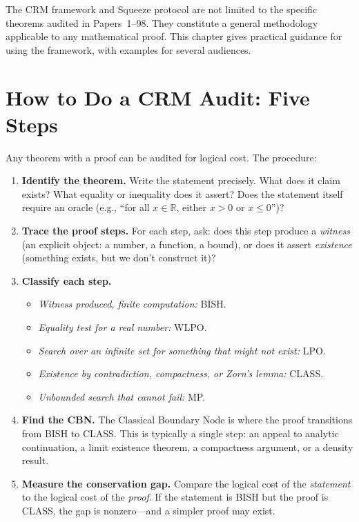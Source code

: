 \documentclass[11pt,twoside,openany]{report}
\theoremstyle{remark}
\newcommand{\BISH}{\textsf{BISH}}
\newcommand{\CLASS}{\textsf{CLASS}}
\begin{document}
The CRM framework and Squeeze protocol are not limited to the specific theorems audited in Papers~1--98. They constitute a general methodology applicable to any mathematical proof. This chapter gives practical guidance for using the framework, with examples for several audiences.


\section{How to Do a CRM Audit: Five Steps}

Any theorem with a proof can be audited for logical cost. The procedure:

\begin{enumerate}
  \item \textbf{Identify the theorem.} Write the statement precisely. What does it claim exists? What equality or inequality does it assert? Does the statement itself require an oracle (e.g., ``for all $x \in \mathbb{R}$, either $x > 0$ or $x \leq 0$'')?

  \item \textbf{Trace the proof steps.} For each step, ask: does this step produce a \emph{witness} (an explicit object: a number, a function, a bound), or does it assert \emph{existence} (something exists, but we don't construct it)?

  \item \textbf{Classify each step.}
  \begin{itemize}
    \item \emph{Witness produced, finite computation:} \BISH.
    \item \emph{Equality test for a real number:} WLPO.
    \item \emph{Search over an infinite set for something that might not exist:} LPO.
    \item \emph{Existence by contradiction, compactness, or Zorn's lemma:} \CLASS.
    \item \emph{Unbounded search that cannot fail:} MP.
  \end{itemize}

  \item \textbf{Find the CBN.} The Classical Boundary Node is where the proof transitions from \BISH{} to \CLASS. This is typically a single step: an appeal to analytic continuation, a limit existence theorem, a compactness argument, or a density result.

  \item \textbf{Measure the conservation gap.} Compare the logical cost of the \emph{statement} to the logical cost of the \emph{proof}. If the statement is \BISH{} but the proof is \CLASS, the gap is nonzero---and a simpler proof may exist.
\end{enumerate}
\end{document}
